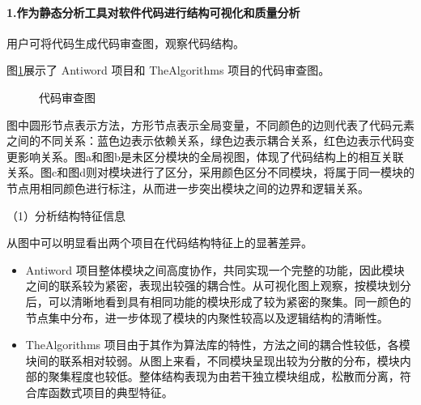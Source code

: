 \paragraph{1.作为静态分析工具对软件代码进行结构可视化和质量分析} 用户可将代码生成代码审查图，观察代码结构。

图\ref{1_代码审查图}展示了 Antiword 项目和 TheAlgorithms 项目的代码审查图。

\begin{figure}[!h]
    \setlength{\subfigcapskip}{-1bp}
    \centering
    \begin{minipage}{\textwidth}
    \centering
    \hspace{2em}
    \end{minipage}
    \centering
    \begin{minipage}{\textwidth}
    \centering
    \hspace{2em}
    \end{minipage}
    \vspace{0.2em}
    \caption{代码审查图} %
    \label{1_代码审查图}
\end{figure}


图中圆形节点表示方法，方形节点表示全局变量，不同颜色的边则代表了代码元素之间的不同关系：蓝色边表示依赖关系，绿色边表示耦合关系，红色边表示代码变更影响关系。图a和图b是未区分模块的全局视图，体现了代码结构上的相互关联关系。图c和图d则对模块进行了区分，采用颜色区分不同模块，将属于同一模块的节点用相同颜色进行标注，从而进一步突出模块之间的边界和逻辑关系。

\noindent（1）分析结构特征信息

从图中可以明显看出两个项目在代码结构特征上的显著差异。
\begin{itemize}
    \item Antiword 项目整体模块之间高度协作，共同实现一个完整的功能，因此模块之间的联系较为紧密，表现出较强的耦合性。从可视化图上观察，按模块划分后，可以清晰地看到具有相同功能的模块形成了较为紧密的聚集。同一颜色的节点集中分布，进一步体现了模块的内聚性较高以及逻辑结构的清晰性。
    
    \item TheAlgorithms 项目由于其作为算法库的特性，方法之间的耦合性较低，各模块间的联系相对较弱。从图上来看，不同模块呈现出较为分散的分布，模块内部的聚集程度也较低。整体结构表现为由若干独立模块组成，松散而分离，符合库函数式项目的典型特征。
\end{itemize}

